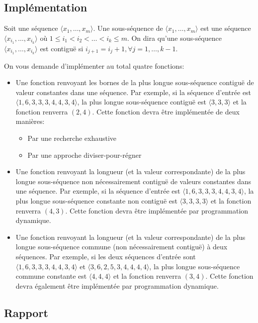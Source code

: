 \documentclass[a4paper,10pt]{article}
\begin{document}
\subsection*{Implémentation}

Soit une séquence $\langle x_1,\ldots,x_m\rangle$. Une sous-séquence
de $\langle x_1,\ldots,x_m\rangle$ est une séquence $\langle
x_{i_1},\ldots,x_{i_k}\rangle$ où $1\leq i_1<i_2<\ldots<i_k\leq m$. On
dira qu'une sous-séquence $\langle x_{i_1},\ldots,x_{i_k}\rangle$ est
contiguë si $i_{j+1}=i_{j}+1, \forall j=1,\ldots,k-1$.

On vous demande d'implémenter au total quatre fonctions:
\begin{itemize}
\item Une fonction renvoyant les bornes de la plus longue
  sous-séquence contiguë de valeur constantes dans une séquence. Par
  exemple, si la séquence d'entrée est $\langle
  1,6,3,3,3,4,4,3,4\rangle$, la plus longue sous-séquence contiguë est
  $\langle 3,3,3\rangle$ et la fonction renverra $(2,4)$. Cette
  fonction devra être implémentée de deux manières:
\begin{itemize}
\item Par une recherche exhaustive
\item Par une approche diviser-pour-régner
\end{itemize}
\item Une fonction renvoyant la longueur (et la valeur correspondante)
  de la plus longue sous-séquence non nécessairement contiguë de
  valeurs constantes dans une séquence. Par exemple, si la séquence
  d'entrée est $\langle 1,6,3,3,3,4,4,3,4\rangle$, la plus longue
  sous-séquence constante non contiguë est $\langle 3,3,3,3\rangle$ et la
  fonction renverra $(4,3)$. Cette fonction devra être implémentée par
  programmation dynamique.
\item Une fonction renvoyant la longueur (et la valeur correspondante)
  de la plus longue sous-séquence commune (non nécessairement
  contiguë) à deux séquences. Par exemple, si les deux séquences
  d'entrée sont $\langle 1,6,3,3,3,4,4,3,4\rangle$ et $\langle
  3,6,2,5,3,4,4,4,4\rangle$, la plus longue sous-séquence commune
  constante est $\langle 4,4,4 \rangle$ et la fonction renverra
  $(3,4)$. Cette fonction devra également être implémentée par
  programmation dynamique.
\end{itemize}

\subsection*{Rapport}
\end{document}
